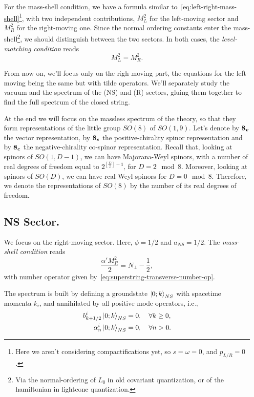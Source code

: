 For the mass-shell condition, we have a formula similar to~\eqref{eq:left-right-mass-shell}\footnote{Here we aren't considering compactifications yet, so $s = \omega = 0$, and $p_{L/R} = 0$.}, with two independent contributions, $M^2_L$ for the left-moving sector and $M^2_R$ for the right-moving one. Since the normal ordering constants enter the mass-shell\footnote{Via the normal-ordering of $L_0$ in old covariant quantization, or of the hamiltonian in lightcone quantization.}, we should distinguish between the two sectors. In both cases, the \emph{level-matching condition} reads
\begin{equation}\label{eq:superstring-level-matching}
    M^2_L = M^2_R.
\end{equation}

From now on, we'll focus only on the righ-moving part, the equations for the left-moving being the same but with tilde operators. We'll separately study the vacuum and the spectrum of the (NS) and (R) sectors, gluing them together to find the full spectrum of the closed string.

At the end we will focus on the massless spectrum of the theory, so that they form representations of the little group $SO(8)$ of $SO(1,9)$. Let's denote by $\boldsymbol{8_v}$ the vector representation, by $\boldsymbol{8_s}$ the positive-chirality spinor representation and by $\boldsymbol{8_c}$ the negative-chirality co-spinor representation. Recall that, looking at spinors of $SO(1,D-1)$, we can have Majorana-Weyl spinors, with a number of real degrees of freedom equal to $2^{[\frac{D}{2}]-1}$, for $D = 2 \mod 8$. Moreover, looking at spinors of $SO(D)$, we can have real Weyl spinors for $D = 0 \mod 8$. Therefore, we denote the representations of $SO(8)$ by the number of its real degrees of freedom. 

\subsection{NS Sector.}
We focus on the right-moving sector. Here, $\phi = 1/2$ and $a_{NS} = 1/2$. The \emph{mass-shell condition} reads
\begin{equation}\label{eq:NS-mass-shell}
    \frac{\alpha' M^2_R}{2} = {N}_\perp - \frac{1}{2},
\end{equation}
with number operator given by~\eqref{eq:superstring-transverse-number-op}.

The spectrum is built by defining a groundstate $\ket{0;k}_{NS}$ with spacetime momenta $k_i$, and annihilated by all positive mode operators, i.e.,
\begin{equation}
\begin{aligned}
    b^i_{k +1/2} \ket{0;k}_{NS} &= 0, \quad \forall k \geq 0, \\
    \alpha^i_n \ket{0;k}_{NS} &= 0, \quad \forall n > 0. \\
\end{aligned}
\end{equation}

